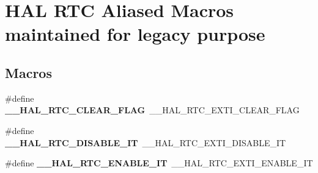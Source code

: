 \hypertarget{group___h_a_l___r_t_c___aliased___macros}{\section{H\-A\-L R\-T\-C Aliased Macros maintained for legacy purpose}
\label{group___h_a_l___r_t_c___aliased___macros}
}
\subsection*{Macros}
\begin{DoxyCompactItemize}
\item 
\hypertarget{group___h_a_l___r_t_c___aliased___macros_gaf8b41c0f2f096d2e71f304c00d183e4d}{\#define {\bfseries \-\_\-\-\_\-\-H\-A\-L\-\_\-\-R\-T\-C\-\_\-\-C\-L\-E\-A\-R\-\_\-\-F\-L\-A\-G}~\-\_\-\-\_\-\-H\-A\-L\-\_\-\-R\-T\-C\-\_\-\-E\-X\-T\-I\-\_\-\-C\-L\-E\-A\-R\-\_\-\-F\-L\-A\-G}\label{group___h_a_l___r_t_c___aliased___macros_gaf8b41c0f2f096d2e71f304c00d183e4d}

\item 
\hypertarget{group___h_a_l___r_t_c___aliased___macros_gae758f64dcd336b7e63308d205cd92697}{\#define {\bfseries \-\_\-\-\_\-\-H\-A\-L\-\_\-\-R\-T\-C\-\_\-\-D\-I\-S\-A\-B\-L\-E\-\_\-\-I\-T}~\-\_\-\-\_\-\-H\-A\-L\-\_\-\-R\-T\-C\-\_\-\-E\-X\-T\-I\-\_\-\-D\-I\-S\-A\-B\-L\-E\-\_\-\-I\-T}\label{group___h_a_l___r_t_c___aliased___macros_gae758f64dcd336b7e63308d205cd92697}

\item 
\hypertarget{group___h_a_l___r_t_c___aliased___macros_ga530c1a5aba6a657bf37fbfb6fb6c4ebc}{\#define {\bfseries \-\_\-\-\_\-\-H\-A\-L\-\_\-\-R\-T\-C\-\_\-\-E\-N\-A\-B\-L\-E\-\_\-\-I\-T}~\-\_\-\-\_\-\-H\-A\-L\-\_\-\-R\-T\-C\-\_\-\-E\-X\-T\-I\-\_\-\-E\-N\-A\-B\-L\-E\-\_\-\-I\-T}\label{group___h_a_l___r_t_c___aliased___macros_ga530c1a5aba6a657bf37fbfb6fb6c4ebc}


\end{DoxyCompactItemize}
